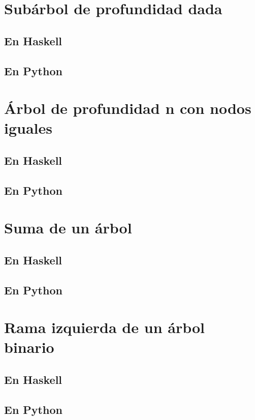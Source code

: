 \documentclass[a4paper,12pt,twoside]{book}
\begin{document}
\section{Subárbol de profundidad dada}
\subsection{En Haskell}
\subsection{En Python}

\section{Árbol de profundidad n con nodos iguales}
\subsection{En Haskell}
\subsection{En Python}

\section{Suma de un árbol}
\subsection{En Haskell}
\subsection{En Python}

\section{Rama izquierda de un árbol binario}
\subsection{En Haskell}
\subsection{En Python}
\end{document}
